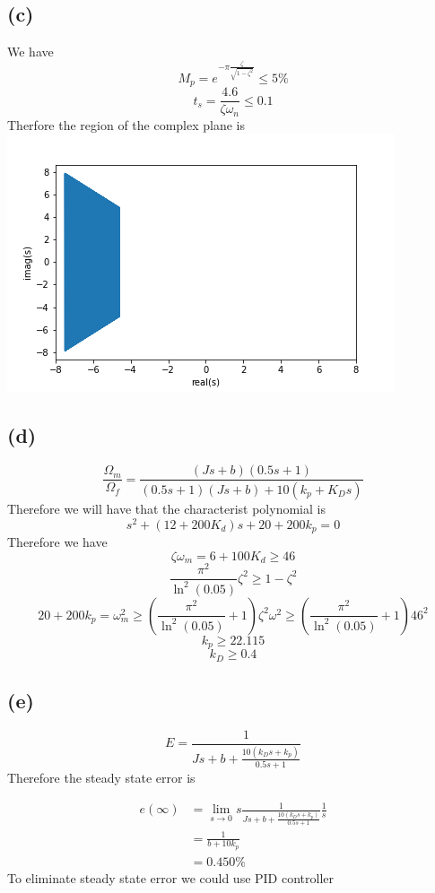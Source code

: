 \documentclass[12pt]{article}
\begin{document}
\subsection*{(c)}
We have 
$$M_p=e^{-\pi\frac{\zeta}{\sqrt{1-\zeta^2}}}\leq 5\%$$
$$t_s=\frac{4.6}{\zeta\omega_n}\leq 0.1$$
Therfore the region of the complex plane is 
\includegraphics[scale=0.5]{fig2}
\FloatBarrier
\subsection*{(d)}
$$\frac{\Omega_m}{\Omega_f}=\frac{(Js+b)(0.5s+1)}{(0.5s+1)(Js+b)+10(k_p+K_Ds)}$$
Therefore we will have that the characterist polynomial is 
$$s^2+(12+200K_d)s+20+200k_p=0$$
Therefore we have
$$\zeta\omega_m=6+100K_d\geq 46$$
$$\frac{\pi^2}{\ln^2(0.05)}\zeta^2\geq1-\zeta^2$$
$$20+200k_p=\omega_m^2\geq\left(\frac{\pi^2}{\ln^2(0.05)}+1\right)\zeta^2\omega^2\geq\left(\frac{\pi^2}{\ln^2(0.05)}+1\right)46^2$$
$$\boxed{k_p\geq22.115}$$
$$\boxed{k_D\geq0.4}$$
\subsection*{(e)}
$$E=\frac{1}{Js+b+\frac{10(k_Ds+k_p)}{0.5s+1}}$$
Therefore the steady state error is

\begin{align*}
    e(\infty)&=\lim_{s\to0}s\frac{1}{Js+b+\frac{10(k_Ds+k_p)}{0.5s+1}}\frac{1}{s}\\
    &=\frac{1}{b+10k_p}\\
    &=0.450\%
\end{align*}
To eliminate steady state error we could use PID controller
\end{document}
